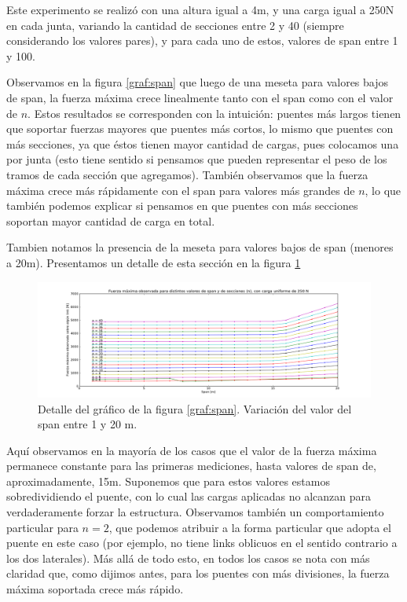 Este experimento se realiz\'o con una altura igual a 4m, y una carga igual a 250N en cada junta, variando la cantidad de secciones entre 2 y 40 (siempre considerando los valores pares), y para cada uno de estos, valores de span entre 1 y 100.

Observamos en la figura \ref{graf:span} que luego de una meseta para valores bajos de span, la fuerza máxima crece linealmente tanto con el span como con el valor de $n$. Estos resultados se corresponden con la intuición: puentes más largos tienen que soportar fuerzas mayores que puentes más cortos, lo mismo que puentes con más secciones, ya que éstos tienen mayor cantidad de cargas, pues colocamos una por junta (esto tiene sentido si pensamos que pueden representar el peso de los tramos de cada sección que agregamos). También observamos que la fuerza máxima crece más rápidamente con el span para valores más grandes de $n$, lo que también podemos explicar si pensamos en que puentes con más secciones soportan mayor cantidad de carga en total.

Tambien notamos la presencia de la meseta para valores bajos de span (menores a 20m). Presentamos un detalle de esta sección en la figura \ref{graf:spanDetalle}
 
\begin{figure}[H]
  \centering
    \includegraphics[width=\textwidth]{../mediciones/spanVariableDicDetalle.png}
    \caption{Detalle del gráfico de la figura \ref{graf:span}. Variación del valor del span entre 1 y 20 m.}
    \label{graf:spanDetalle}
\end{figure} 
 
Aquí observamos en la mayoría de los casos que el valor de la fuerza máxima permanece constante para las primeras mediciones, hasta valores de span de, aproximadamente, 15m. Suponemos que para estos valores estamos sobredividiendo el puente, con lo cual las cargas aplicadas no alcanzan para verdaderamente forzar la estructura. Observamos también un comportamiento particular para $n = 2$, que podemos atribuir a la forma particular que adopta el puente en este caso (por ejemplo, no tiene links oblicuos en el sentido contrario a los dos laterales). Más allá de todo esto, en todos los casos se nota con más claridad que, como dijimos antes, para los puentes con más divisiones, la fuerza máxima soportada crece más rápido. 
 
